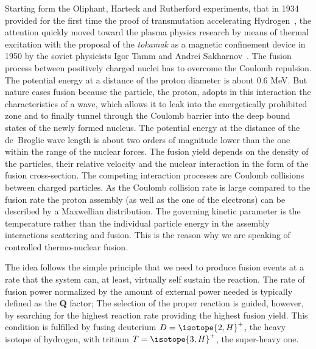 Starting form the Oliphant, Harteck and Rutherford experiments, that in 1934 provided for the first time the proof of transmutation accelerating Hydrogen~\cite{1934RSPSA.144..692O}, the attention quickly moved toward the plasma physics research by means of thermal excitation with the proposal of the \textit{tokamak} as a magnetic confinement device in 1950 by the soviet physicists Igor Tamm and Andrei Sakharnov~\cite{}. 
%
The fusion process between positively charged nuclei has to overcome the Coulomb repulsion. The potential energy at a distance of the proton diameter is about 0.6 MeV. But nature eases fusion because the particle, the proton, adopts in this interaction the characteristics of a wave, which allows it to leak into the energetically prohibited zone and to finally tunnel through the Coulomb barrier into the deep bound states of the newly formed nucleus. The potential energy at the distance of the de~Broglie wave length is about two orders of magnitude lower than the one within the range of the nuclear forces. The fusion yield depends on the density of the particles, their relative velocity and the nuclear interaction in the form of the fusion cross-section. 
The competing interaction processes are Coulomb collisions between charged particles. As the Coulomb collision rate is large compared to the fusion rate the proton assembly (as well as the one of the electrons) can be described by a Maxwellian distribution. The governing kinetic parameter is the temperature rather than the individual particle energy in the assembly interactions scattering and fusion. This is the reason why we are speaking of controlled thermo-nuclear fusion.

The idea follows the simple principle that we need to produce fusion events at a rate that the system can, at least, virtually self sustain the reaction. 
\cite{Wagner.Friedrich:magnetic.confinement.intro}
The rate of fusion power normalized by the amount of external power needed is typically defined as the \textbf{Q} factor; 
The selection of the proper reaction is guided, however, by searching for the highest reaction rate providing the highest fusion yield. This condition is fulfilled by fusing deuterium $D=\isotope{2,H}^+$, the heavy isotope of hydrogen, with tritium $T=\isotope{3,H}^+$, the super-heavy one.

